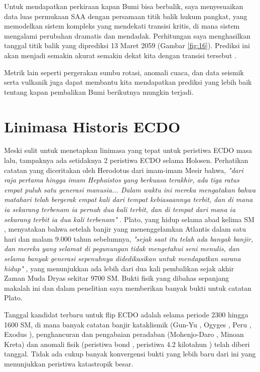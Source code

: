 \documentclass[10pt,twocolumn,letterpaper]{article}
\begin{document}
Untuk mendapatkan perkiraan kapan Bumi bisa berbalik, saya menyesuaikan data luas permukaan SAA dengan persamaan titik balik hukum pangkat, yang memodelkan sistem kompleks yang mendekati transisi kritis, di mana sistem mengalami perubahan dramatis dan mendadak. Perhitungan saya menghasilkan tanggal titik balik yang diprediksi 13 Maret 2059 (Gambar \ref{fig:16}). Prediksi ini akan menjadi semakin akurat semakin dekat kita dengan transisi tersebut \cite{136}.

Metrik lain seperti pergerakan sumbu rotasi, anomali cuaca, dan data seismik serta vulkanik juga dapat membantu kita mendapatkan prediksi yang lebih baik tentang kapan pembalikan Bumi berikutnya mungkin terjadi.

\section{Linimasa Historis ECDO}

Meski sulit untuk menetapkan linimasa yang tepat untuk peristiwa ECDO masa lalu, tampaknya ada setidaknya 2 peristiwa ECDO selama Holosen. Perhatikan catatan yang diceritakan oleh Herodotus dari imam-imam Mesir bahwa, \textit{"dari raja pertama hingga imam Hephaistos yang berkuasa terakhir, ada tiga ratus empat puluh satu generasi manusia... Dalam waktu ini mereka mengatakan bahwa matahari telah bergerak empat kali dari tempat kebiasaannya terbit, dan di mana ia sekarang terbenam ia pernah dua kali terbit, dan di tempat dari mana ia sekarang terbit ia dua kali terbenam"} \cite{32}. Plato, yang hidup selama abad kelima SM \cite{111}, menyatakan bahwa setelah banjir yang menenggelamkan Atlantis dalam satu hari dan malam 9.000 tahun sebelumnya, \textit{"sejak saat itu telah ada banyak banjir, dan mereka yang selamat di pegunungan tidak mengetahui seni menulis, dan selama banyak generasi sepenuhnya didedikasikan untuk mendapatkan sarana hidup"} \cite{112}, yang menunjukkan ada lebih dari dua kali pembalikan sejak akhir Zaman Muda Dryas sekitar 9700 SM. Bukti fisik yang dibahas sepanjang makalah ini dan dalam penelitian saya \cite{2} memberikan banyak bukti untuk catatan Plato.

Tanggal kandidat terbaru untuk flip ECDO adalah selama periode 2300 hingga 1600 SM, di mana banyak catatan banjir kataklismik (Gun-Yu \cite{113,114,115}, Ogyges \cite{116,117}, Peru \cite{118,119}, Exodus \cite{120}), penghancuran dan pengabaian peradaban (Mohenjo-Daro \cite{121}, Minoan Kreta\cite{100,101}) dan anomali fisik (peristiwa bond \cite{122}, peristiwa 4.2 kilotahun \cite{90}) telah diberi tanggal. Tidak ada cukup banyak konvergensi bukti yang lebih baru dari ini yang menunjukkan peristiwa katastropik besar.
\end{document}
